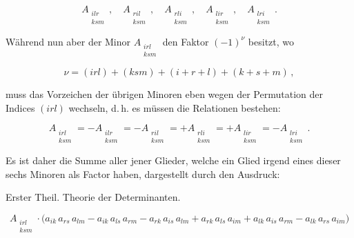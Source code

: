 \[
A_{\substack{ilr\\ksm}}\,,\quad A_{\substack{ril\\ksm}}\,,\quad A_{\substack{rli\\ksm}}\,,\quad
A_{\substack{lir\\ksm}}\,,\quad A_{\substack{lri\\ksm}}\,.
\]

W\"ahrend nun aber der Minor $A_{\substack{irl\\ksm}}$ den Faktor $(-1)^\nu$ besitzt, wo

\[
\nu = (irl)+(ksm)+(i+r+l)+(k+s+m)\,,
\]

muss das Vorzeichen der \"ubrigen Minoren eben wegen der Permutation der Indices $(irl)$
wechseln, d.\,h. es m\"ussen die Relationen bestehen:

\[
A_{\substack{irl\\ksm}} = -A_{\substack{ilr\\ksm}} = -A_{\substack{ril\\ksm}} =
+A_{\substack{rli\\ksm}} = +A_{\substack{lir\\ksm}} = -A_{\substack{lri\\ksm}}\,.
\]

Es ist daher die Summe aller jener Glieder, welche ein Glied irgend eines dieser sechs Minoren
als Factor haben, dargestellt durch den Ausdruck:


Erster Theil. Theorie der Determinanten.

\[
A_{\substack{irl\\ksm}} \cdot \bigl(
a_{ik}\,a_{rs}\,a_{lm} - a_{ik}\,a_{ls}\,a_{rm} - a_{rk}\,a_{is}\,a_{lm} + a_{rk}\,a_{ls}\,a_{im}
+ a_{lk}\,a_{is}\,a_{rm} - a_{lk}\,a_{rs}\,a_{im}
\bigr)
\]

